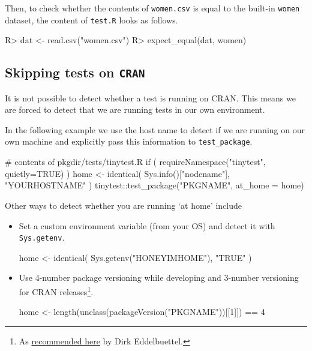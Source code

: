 \documentclass[11pt]{article}
\newcommand{\code}[1]{\texttt{#1}}
\begin{document}
Then, to check whether the contents of \code{women.csv} is equal to the 
built-in \code{women} dataset,  the content of \code{test.R} looks as follows.
\begin{Schunk}
\begin{Sinput}
R>  dat <- read.csv("women.csv")
R>  expect_equal(dat, women)
\end{Sinput}
\end{Schunk}



\subsection{Skipping tests on \code{CRAN}}
It is not possible to detect whether a test is running on CRAN. This means we
are forced to detect that we are running tests in our own environment. 

In the following example we use the host name to detect if we are running on
our own machine and explicitly pass this information to \code{test\_package}.
\begin{Schunk}
\begin{Sinput}
  # contents of pkgdir/tests/tinytest.R
  if ( requireNamespace("tinytest", quietly=TRUE) ){
     home <- identical( Sys.info()["nodename"], "YOURHOSTNAME" )
     tinytest::test_package("PKGNAME", at_home = home)
  }
\end{Sinput}
\end{Schunk}
Other ways to detect whether you are running `at home' include
\begin{itemize}
\item Set a custom environment variable (from your OS) and detect it with \code{Sys.getenv}.
\begin{Schunk}
\begin{Sinput}
  home <- identical( Sys.getenv("HONEYIMHOME"), "TRUE" )
\end{Sinput}
\end{Schunk}
\item Use 4-number package versioning while developing and 3-number versioning
for CRAN releases\footnote{As \href{https://stackoverflow.com/questions/36166288/skip-tests-on-cran-but-run-locally}{recommended here} by Dirk Eddelbuettel.}.
\begin{Schunk}
\begin{Sinput}
  home <- length(unclass(packageVersion("PKGNAME"))[[1]]) == 4
\end{Sinput}
\end{Schunk}
\end{itemize}
\end{document}
